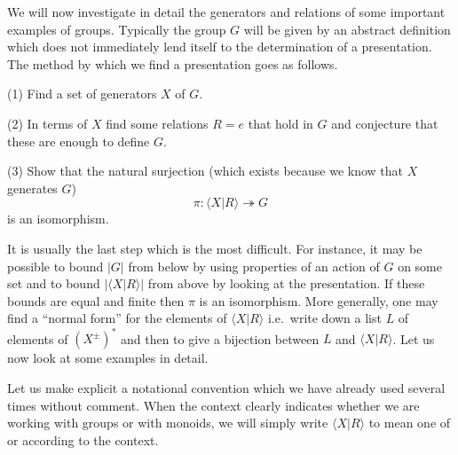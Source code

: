 \begin{ap} We will now investigate in detail the generators and relations of
    some important examples of groups. Typically the group $G$ will be given by
    an abstract definition which does not immediately lend itself to the
    determination of a presentation. The method by which we find a presentation
    goes as follows.

    (1) Find a set of generators $X$ of $G$.

    (2) In terms of $X$ find some relations $R=e$ that hold in $G$ and conjecture that these are enough to define $G$.

    (3) Show that the natural surjection (which exists because we know that $X$ generates $G$) \[\pi: \langle X | R \rangle \twoheadrightarrow G \] is an isomorphism.

    It is usually the last step which is the most difficult. For instance, it
    may be possible to bound $|G|$ from below by using properties of an action
    of $G$ on some set and to bound $|\langle X|R\rangle|$ from above by
    looking at the presentation. If these bounds are equal and finite then
    $\pi$ is an isomorphism. More generally, one may find a ``normal form'' for
    the elements of \(\langle X|R\rangle \) i.e.~write down a list $L$ of
    elements of $(X^{\pm})^*$ and then to give a bijection between $L$ and
    \(\langle X|R\rangle\). Let us now look at some examples in detail.
\end{ap}

\begin{rem} Let us make explicit a notational convention which we have already
    used several times without comment. When the context clearly indicates
    whether we are working with groups or with monoids, we will simply write
    \(\langle X |R\rangle\) to mean one of  or  according to
    the context.
\end{rem}

